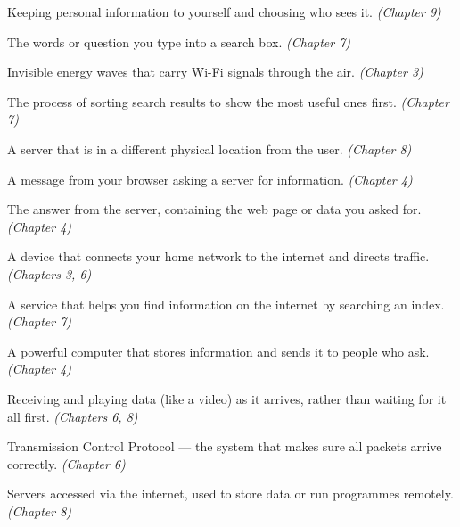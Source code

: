 \begin{tcolorbox}
\begin{description}[labelwidth=4cm, leftmargin=4.2cm, style=nextline, itemsep=0.45\baselineskip]
\item[\glossterm{Privacy}]
Keeping personal information to yourself and choosing who sees it.
\emph{(Chapter 9)}

\item[\glossterm{Query}]
The words or question you type into a search box.
\emph{(Chapter 7)}

\item[\glossterm{Radio waves}]
Invisible energy waves that carry Wi-Fi signals through the air.
\emph{(Chapter 3)}

\item[\glossterm{Ranking}]
The process of sorting search results to show the most useful ones first.
\emph{(Chapter 7)}

\item[\glossterm{Remote server}]
A server that is in a different physical location from the user.
\emph{(Chapter 8)}

\item[\glossterm{Request}]
A message from your browser asking a server for information.
\emph{(Chapter 4)}

\item[\glossterm{Response}]
The answer from the server, containing the web page or data you asked for.
\emph{(Chapter 4)}

\item[\glossterm{Router}]
A device that connects your home network to the internet and directs traffic.
\emph{(Chapters 3, 6)}

\item[\glossterm{Search engine}]
A service that helps you find information on the internet by searching an index.
\emph{(Chapter 7)}

\item[\glossterm{Server}]
A powerful computer that stores information and sends it to people who ask.
\emph{(Chapter 4)}

\item[\glossterm{Streaming}]
Receiving and playing data (like a video) as it arrives, rather than waiting for it all first.
\emph{(Chapters 6, 8)}

\item[\glossterm{TCP}]
Transmission Control Protocol — the system that makes sure all packets arrive correctly.
\emph{(Chapter 6)}

\item[\glossterm{The cloud}]
Servers accessed via the internet, used to store data or run programmes remotely.
\emph{(Chapter 8)}


\end{description}
\end{tcolorbox}
